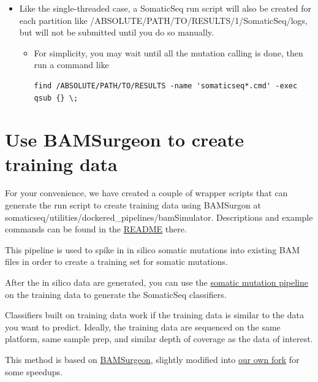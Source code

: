 \documentclass[10pt,letterpaper]{article}
\begin{document}
\begin{sloppypar}
\begin{itemize}
  \item
  Like the single-threaded case, a SomaticSeq run script will also be created for each partition like /ABSOLUTE/PATH/TO/RESULTS/1/SomaticSeq/logs, but will not be submitted until you do so manually.

      
    \begin{itemize}
    \item   
    For simplicity, you may wait until all the mutation calling is done, then run a command like 
    \begin{lstlisting}
find /ABSOLUTE/PATH/TO/RESULTS -name 'somaticseq*.cmd' -exec qsub {} \;
    \end{lstlisting}

    \end{itemize}

\end{itemize}





\section{Use BAMSurgeon to create training data}

For your convenience, we have created a couple of wrapper scripts that can generate the run script to create training data using BAMSurgon at somaticseq/utilities/dockered\_pipelines/bamSimulator. Descriptions and example commands can be found in the \href{https://github.com/bioinform/somaticseq/tree/master/somaticseq/utilities/dockered_pipelines/bamSimulator}{README} there. 

This pipeline is used to spike in in silico somatic mutations into existing BAM files in order to create a training set for somatic mutations.

After the in silico data are generated, you can use the \href{https://github.com/bioinform/somaticseq/blob/master/somaticseq/utilities/dockered_pipelines}{somatic mutation pipeline} on the training data to generate the SomaticSeq classifiers.

Classifiers built on training data work if the training data is similar to the data you want to predict. Ideally, the training data are sequenced on the same platform, same sample prep, and similar depth of coverage as the data of interest.

This method is based on \href{https://github.com/adamewing/bamsurgeon}{BAMSurgeon}, slightly modified into \href{https://github.com/ltfang-bina/bamsurgeon}{our own fork} for some speedups.


\end{sloppypar}
\end{document}

